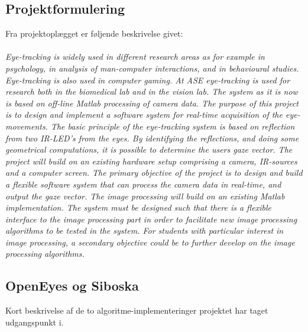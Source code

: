 \documentclass[rapport.tex]{subfiles}
\begin{document}
	\subsection{Projektformulering}
	Fra projektoplægget er føljende beskrivelse givet:\\
	\\
\textit{	Eye-tracking is widely used in different research areas as for example in psychology, in analysis of man-computer interactions, and in behavioural studies. Eye-tracking is also used in computer gaming. At ASE eye-tracking is used for research both in the biomedical lab and in the vision lab. The system as it is now is based on off-line Matlab processing of camera data. The purpose of this project is to design and implement a software system for real-time acquisition of the eye-movements. The basic principle of the eye-tracking system is based on reflection from two IR-LED’s from the eyes. By identifying the reflections, and doing some geometrical computations, it is possible to determine the users gaze vector. 
	The project will build on an existing hardware setup comprising a camera, IR-sources and a computer screen. The primary objective of the project is to design and build a flexible software system that can process the camera data in real-time, and output the gaze vector. The image processing will build on an existing Matlab implementation. The system must be designed such that there is a flexible interface to the image processing part in order to facilitate new image processing algorithms to be tested in the system. For students with particular interest in image processing, a secondary objective could be to further develop on the image processing algorithms.} 
	\\
	
	\subsection{OpenEyes og Siboska}
	Kort beskrivelse af de to algoritme-implementeringer projektet har taget udgangspunkt i.	
	
		
\end{document}
